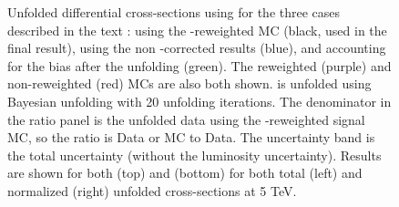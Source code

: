 \begin{figure}[h]
\centering
{}

\caption{Unfolded differential cross-sections using \ut for the three cases described in the text : using the \pt-reweighted MC (black, used in the final result), using the non \pt-corrected results (blue), and accounting for the bias after the unfolding (green). The reweighted (purple) and non-reweighted (red) MCs are also both shown. \ut is unfolded using Bayesian unfolding with 20 unfolding iterations. The denominator in the ratio panel is the unfolded data using the \pt-reweighted signal MC, so the ratio is Data or MC to Data. The uncertainty band is the total uncertainty (without the luminosity uncertainty). Results are shown for both \Zee (top) and \Zmm (bottom) for both total (left) and normalized (right) unfolded cross-sections at 5 TeV.}\end{figure}
